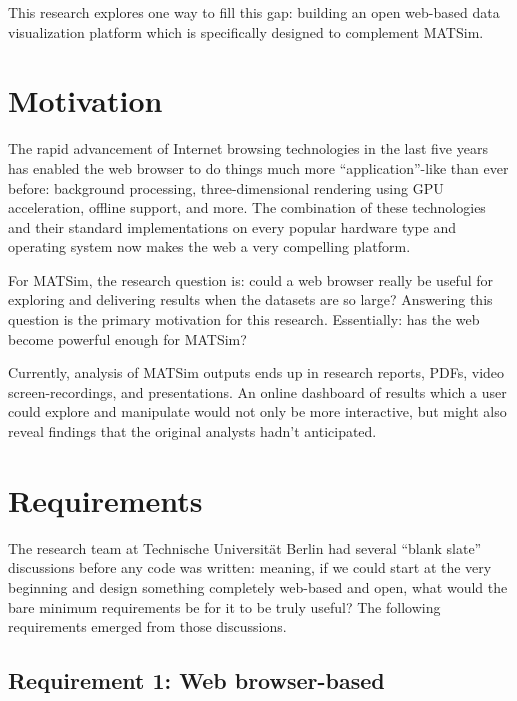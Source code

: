 This research explores one way to fill this gap: building an open web-based data visualization platform which is specifically designed to complement MATSim.

\hypertarget{mathub-motivation}{%
\section{Motivation}\label{mathub-motivation}}

The rapid advancement of Internet browsing technologies in the last five years has enabled the web browser to do things much more ``application''-like than ever before: background processing, three-dimensional rendering using GPU acceleration, offline support, and more. The combination of these technologies and their standard implementations on every popular hardware type and operating system now makes the web a very compelling platform.

For MATSim, the research question is: could a web browser really be useful for exploring and delivering results when the datasets are so large? Answering this question is the primary motivation for this research. Essentially: has the web become powerful enough for MATSim?

Currently, analysis of MATSim outputs ends up in research reports, PDFs, video screen-recordings, and presentations. An online dashboard of results which a user could explore and manipulate would not only be more interactive, but might also reveal findings that the original analysts hadn't anticipated.

\hypertarget{mathub-requirements}{%
\section{Requirements}\label{requirements}}

The research team at Technische Universität Berlin had several ``blank slate'' discussions before any code was written: meaning, if we could start at the very beginning and design something completely web-based and open, what would the bare minimum requirements be for it to be truly useful? The following requirements emerged from those discussions.

\hypertarget{requirement-1-web-browser-based}{%
\subsection{Requirement 1: Web browser-based}\label{requirement-1-web-browser-based}}

